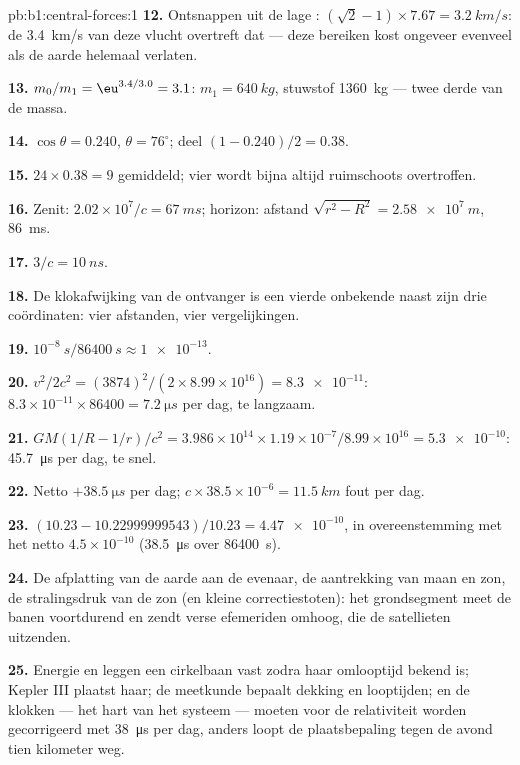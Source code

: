 \begin{solution}{pb:b1:central-forces:1}
\textbf{12.} Ontsnappen uit de lage : $(\sqrt2 - 1)\times 7.67 = \qty{3.2}{km/s}$:
de \qty{3.4}{km/s} van deze vlucht overtreft dat --- deze  bereiken kost
ongeveer evenveel als de aarde helemaal verlaten.

\textbf{13.} $m_0/m_1 = \eu^{3.4/3.0} = 3.1$: $m_1 = \qty{640}{kg}$,
stuwstof \qty{1360}{kg} --- twee derde van de massa.

\textbf{14.} $\cos\theta = 0.240$, $\theta = 76^\circ$; deel $(1 - 0.240)/2
= 0.38$.

\textbf{15.} $24 \times 0.38 = 9$ gemiddeld; vier wordt bijna altijd
ruimschoots overtroffen.

\textbf{16.} Zenit: $2.02\times10^7/c = \qty{67}{ms}$; horizon: afstand
$\sqrt{r^2 - R^2} = \qty{2.58e7}{m}$, \qty{86}{ms}.

\textbf{17.} $3/c = \qty{10}{ns}$.

\textbf{18.} De klokafwijking van de ontvanger is een vierde onbekende naast zijn
drie coördinaten: vier afstanden, vier vergelijkingen.

\textbf{19.} $10^{-8}\ \unit{s}/\qty{86400}{s} \approx \num{1e-13}$.

\textbf{20.} $v^2/2c^2 = (3874)^2/(2 \times 8.99\times10^{16}) = \num{8.3e-11}$:
$8.3\times10^{-11} \times 86400 = \qty{7.2}{\micro s}$ per dag, te langzaam.

\textbf{21.} $GM(1/R - 1/r)/c^2 = 3.986\times10^{14} \times 1.19\times10^{-7}/
8.99\times10^{16} = \num{5.3e-10}$: \qty{45.7}{\micro s} per dag, te snel.

\textbf{22.} Netto $+\qty{38.5}{\micro s}$ per dag; $c \times 38.5\times10^{-6}
= \qty{11.5}{km}$ fout per dag.

\textbf{23.} $(10.23 - 10.22999999543)/10.23 = \num{4.47e-10}$, in overeenstemming
met het netto $4.5\times10^{-10}$ (\qty{38.5}{\micro s} over \qty{86400}{s}).

\textbf{24.} De afplatting van de aarde aan de evenaar, de aantrekking van maan
en zon, de stralingsdruk van de zon (en kleine correctiestoten): het
grondsegment meet de banen voortdurend en zendt verse
efemeriden omhoog, die de satellieten uitzenden.

\textbf{25.} Energie en  leggen een cirkelbaan vast zodra haar
omlooptijd bekend is; Kepler III plaatst haar; de meetkunde bepaalt dekking en
looptijden; en de klokken --- het hart van het systeem --- moeten voor de
relativiteit worden gecorrigeerd met \qty{38}{\micro s} per dag, anders loopt de
plaatsbepaling tegen de avond tien kilometer weg.
\end{solution}
